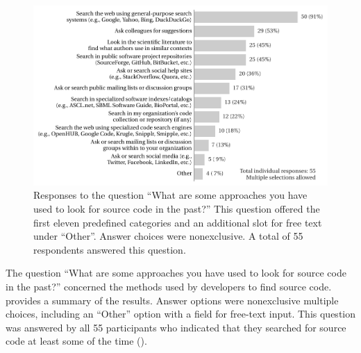 \documentclass{casicswhitepaper}
\newcommand{\totalSearchers}{55\xspace}
\begin{document}
\begin{figure}[b]
  \vspace*{-2ex}
  \centering
  \includegraphics{files/plots/how-find-src.pdf}
  \vspace*{-4ex}
  \caption{Responses to the question ``What are some approaches you have used to look for source code in the past?''  This question offered the first eleven predefined categories and an additional slot for free text under ``Other''.  Answer choices were nonexclusive.  A total of \totalSearchers respondents answered this question.}
  \label{how-find-src}
\end{figure}

The question ``What are some approaches you have used to look for source code in the past?'' concerned the methods used by developers to find source code.   provides a summary of the results.  Answer options were nonexclusive multiple choices, including an ``Other'' option with a field for free-text input.  This question was answered by all \totalSearchers participants who indicated that they searched for source code at least some of the time ().
\end{document}
